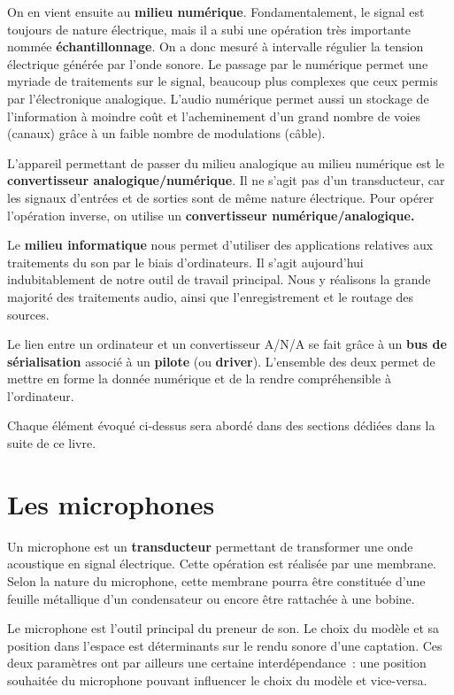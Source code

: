 \documentclass[
]{book}
\begin{document}
On en vient ensuite au \textbf{milieu numérique}. Fondamentalement, le signal est toujours de nature électrique, mais il a subi une opération très importante nommée \textbf{échantillonnage}. On a donc mesuré à intervalle régulier la tension électrique générée par l'onde sonore. Le passage par le numérique permet une myriade de traitements sur le signal, beaucoup plus complexes que ceux permis par l'électronique analogique. L'audio numérique permet aussi un stockage de l'information à moindre coût et l'acheminement d'un grand nombre de voies (canaux) grâce à un faible nombre de modulations (câble).

L'appareil permettant de passer du milieu analogique au milieu numérique est le \textbf{convertisseur analogique/numérique}. Il ne s'agit pas d'un transducteur, car les signaux d'entrées et de sorties sont de même nature électrique. Pour opérer l'opération inverse, on utilise un \textbf{convertisseur numérique/analogique.}

Le \textbf{milieu informatique} nous permet d'utiliser des applications relatives aux traitements du son par le biais d'ordinateurs. Il s'agit aujourd'hui indubitablement de notre outil de travail principal. Nous y réalisons la grande majorité des traitements audio, ainsi que l'enregistrement et le routage des sources.

Le lien entre un ordinateur et un convertisseur A/N/A se fait grâce à un \textbf{bus de sérialisation} associé à un \textbf{pilote} (ou \textbf{driver}). L'ensemble des deux permet de mettre en forme la donnée numérique et de la rendre compréhensible à l'ordinateur.

Chaque élément évoqué ci-dessus sera abordé dans des sections dédiées dans la suite de ce livre.

\hypertarget{les-microphones}{%
\chapter{Les microphones}\label{les-microphones}}

Un microphone est un \textbf{transducteur} permettant de transformer une onde acoustique en signal électrique. Cette opération est réalisée par une membrane. Selon la nature du microphone, cette membrane pourra être constituée d'une feuille métallique d'un condensateur ou encore être rattachée à une bobine.

Le microphone est l'outil principal du preneur de son. Le choix du modèle et sa position dans l'espace est déterminants sur le rendu sonore d'une captation. Ces deux paramètres ont par ailleurs une certaine interdépendance~: une position souhaitée du microphone pouvant influencer le choix du modèle et vice-versa.
\end{document}
